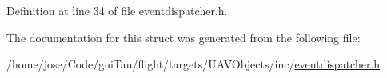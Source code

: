 Definition at line 34 of file eventdispatcher.\-h.



The documentation for this struct was generated from the following file\-:\begin{DoxyCompactItemize}
\item 
/home/jose/\-Code/gui\-Tau/flight/targets/\-U\-A\-V\-Objects/inc/\hyperlink{eventdispatcher_8h}{eventdispatcher.\-h}\end{DoxyCompactItemize}
